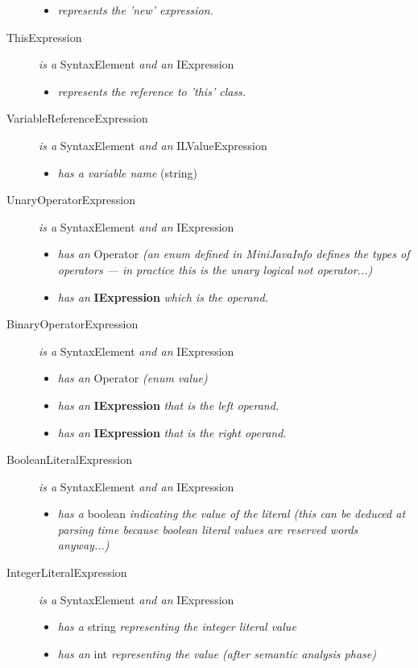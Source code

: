 \documentclass[a4paper,11pt]{article}
\begin{document}
\begin{description}
\begin{itemize}
        \item \emph{represents the 'new' expression.}
      \end{itemize}
    \item[ThisExpression] \emph{is a} SyntaxElement \emph{and an} IExpression
      \begin{itemize}
        \item \emph{represents the reference to 'this' class.}
      \end{itemize}
    \item[VariableReferenceExpression] \emph{is a} SyntaxElement \emph{and an} ILValueExpression
      \begin{itemize}
        \item \emph{has a variable name} (string)
      \end{itemize}
    \item[UnaryOperatorExpression] \emph{is a} SyntaxElement \emph{and an} IExpression
      \begin{itemize}
        \item \emph{has an} Operator \emph{(an enum defined in MiniJavaInfo defines the types of operators --- in practice this is the unary logical not operator...)}
        \item \emph{has an} \textbf{IExpression} \emph{which is the operand.}
      \end{itemize}
    \item[BinaryOperatorExpression] \emph{is a} SyntaxElement \emph{and an} IExpression
      \begin{itemize}
        \item \emph{has an} Operator \emph{(enum value)}
        \item \emph{has an} \textbf{IExpression} \emph{that is the left operand.}
        \item \emph{has an} \textbf{IExpression} \emph{that is the right operand.}
      \end{itemize}
    \item[BooleanLiteralExpression] \emph{is a} SyntaxElement \emph{and an} IExpression
      \begin{itemize}
        \item \emph{has a} boolean \emph{indicating the value of the literal (this can be deduced at parsing time because boolean literal values are reserved words anyway...)}
      \end{itemize}
    \item[IntegerLiteralExpression] \emph{is a} SyntaxElement \emph{and an} IExpression
      \begin{itemize}
        \item \emph{has a} string \emph{representing the integer literal value}
        \item \emph{has an} int \emph{representing the value (after semantic analysis phase)}
      \end{itemize}
\end{description}
\end{document}
